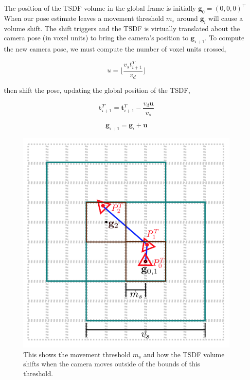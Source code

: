 \documentclass[10pt, twocolumn]{article}
\begin{document}
The position of the TSDF volume in the global frame is initially $\mathbf{g}_{0} = (0, 0, 0)^{\top}$
When our pose estimate leaves a movement threshold $m_{s}$ around $\mathbf{g}_{i}$ will cause a volume shift.
The shift triggers and the TSDF is virtually translated about the camera pose (in voxel units) to bring the camera's position to $\mathbf{g}_{i+1}$.
To compute the new camera pose, we must compute the number of voxel units crossed,

\begin{equation}
u = \lfloor \frac{v_{s}t^{T}_{i+1}}{v_d} \rfloor
\end{equation}

then shift the pose, updating the global position of the TSDF,

\begin{equation}
\mathbf{t}^{T'}_{i+1} = \mathbf{t}^{T}_{i+1} - \frac{v_{d}\mathbf{u}}{v_{s}}
\end{equation}

\begin{equation}
\mathbf{g}_{i+1} = \mathbf{g}_{i} + \mathbf{u}
\end{equation}

\begin{figure}
  \centering
  \includegraphics[width=0.8\linewidth]{tsdfshift}
  \caption{This shows the movement threshold $m_s$ and how the TSDF volume shifts when the camera moves outside of the bounds of this threshold.}
  \label{fig:tsdfshift}
\end{figure}
\end{document}
